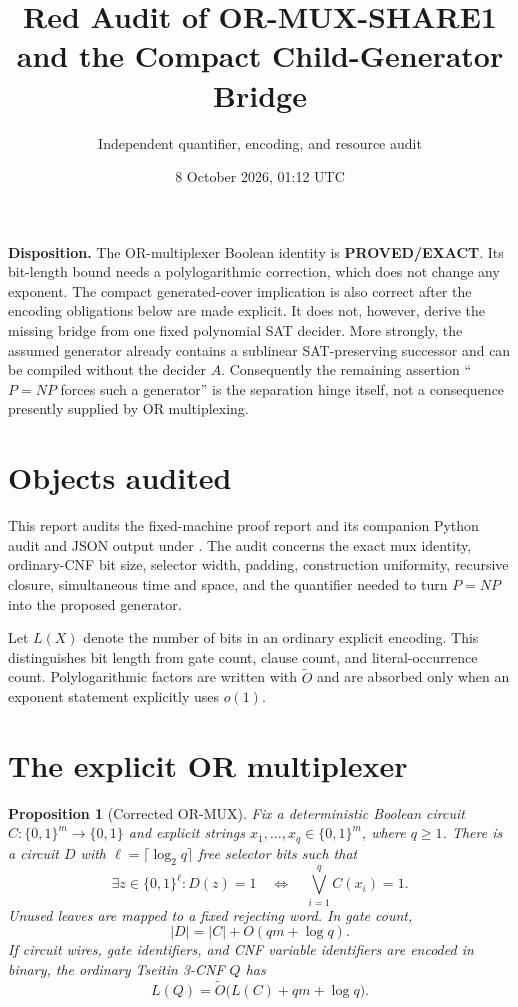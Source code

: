 \documentclass[11pt]{article}
\title{\bfseries Red Audit of OR-MUX-SHARE1\\
and the Compact Child-Generator Bridge}
\author{Independent quantifier, encoding, and resource audit}
\date{8 October 2026, 01:12 UTC}
\newcommand{\EXACT}{\textcolor{exact}{\textbf{PROVED/EXACT}}}
\newtheorem{proposition}[theorem]{Proposition}
\begin{document}
\maketitle

\begin{guardbox}
\textbf{Disposition.}
The OR-multiplexer Boolean identity is \EXACT.  Its bit-length bound needs a
polylogarithmic correction, which does not change any exponent.  The compact
generated-cover implication is also correct after the encoding obligations
below are made explicit.  It does not, however, derive the missing bridge
from one fixed polynomial SAT decider.  More strongly, the assumed generator
already contains a sublinear SAT-preserving successor and can be compiled
without the decider $A$.  Consequently the remaining assertion
``$P=NP$ forces such a generator'' is the separation hinge itself, not a
consequence presently supplied by OR multiplexing.
\end{guardbox}

\section{Objects audited}

This report audits the fixed-machine proof report and its companion Python
audit and JSON output under .
The audit concerns the exact mux identity, ordinary-CNF bit size, selector
width, padding, construction uniformity, recursive closure, simultaneous
time and space, and the quantifier needed to turn $P=NP$ into the proposed
generator.

Let $L(X)$ denote the number of bits in an ordinary explicit encoding.  This
distinguishes bit length from gate count, clause count, and literal-occurrence
count.  Polylogarithmic factors are written with $\widetilde O$ and are
absorbed only when an exponent statement explicitly uses $o(1)$.

\section{The explicit OR multiplexer}

\begin{proposition}[Corrected OR-MUX]
Fix a deterministic Boolean circuit $C:\{0,1\}^m\to\{0,1\}$ and explicit
strings $x_1,\ldots,x_q\in\{0,1\}^m$, where $q\ge1$.  There is a circuit
$D$ with $\ell=\lceil\log_2 q\rceil$ free selector bits such that
\[
 \exists z\in\{0,1\}^{\ell}:D(z)=1
 \quad\Longleftrightarrow\quad
 \bigvee_{i=1}^{q}C(x_i)=1.
\]
Unused leaves are mapped to a fixed rejecting word.  In gate count,
\[
 |D|=|C|+O(qm+\log q).
\]
If circuit wires, gate identifiers, and CNF variable identifiers are encoded
in binary, the ordinary Tseitin 3-CNF $Q$ has
\[
 L(Q)=\widetilde O\bigl(L(C)+qm+\log q\bigr).           \tag{1}
\]
\end{proposition}
\end{document}
